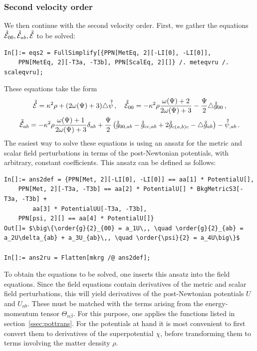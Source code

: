 \documentclass[notitlepage,a4paper,aps,prd,onecolumn,superscriptaddress,nofootinbib,groupedaddress,longbibliography]{revtex4-1}
\newcommand{\order}[2]{\accentset{#2}{#1}}
\begin{document}
\subsubsection{Second velocity order}\label{sssec:vel2}
We then continue with the second velocity order. First, we gather the equations \(\order{\mathcal{E}}{2}_{00}, \order{\mathcal{E}}{2}_{ab}, \order{\mathcal{E}}{2}\) to be solved:
\begin{lstlisting}
In[]:= eqs2 = FullSimplify[{PPN[MetEq, 2][-LI[0], -LI[0]],
	PPN[MetEq, 2][-T3a, -T3b], PPN[ScalEq, 2][]} /. meteqvru /. scaleqvru];
\end{lstlisting}
These equations take the form
\begin{gather}
\order{\mathcal{E}}{2} = \kappa^2\rho + (2\omega(\Psi) + 3)\triangle\order{\psi}{2}\,, \quad
\order{\mathcal{E}}{2}_{00} = -\kappa^2\rho\frac{\omega(\Psi) + 2}{2\omega(\Psi) + 3} - \frac{\Psi}{2}\triangle\order{g}{2}_{00}\,,\nonumber\\
\order{\mathcal{E}}{2}_{ab} = -\kappa^2\rho\frac{\omega(\Psi) + 1}{2\omega(\Psi) + 3}\delta_{ab} + \frac{\Psi}{2}\left(\order{g}{2}_{00,ab} - \order{g}{2}_{cc,ab} + 2\order{g}{2}_{c(a,b)c} - \triangle\order{g}{2}_{ab}\right) - \order{\psi}{2}_{,ab}\,.
\end{gather}
The easiest way to solve these equations is using an ansatz for the metric and scalar field perturbations in terms of the post-Newtonian potentials, with arbitrary, constant coefficients. This ansatz can be defined as follows:
\begin{lstlisting}
In[]:= ans2def = {PPN[Met, 2][-LI[0], -LI[0]] == aa[1] * PotentialU[],
	PPN[Met, 2][-T3a, -T3b] == aa[2] * PotentialU[] * BkgMetricS3[-T3a, -T3b] +
		aa[3] * PotentialUU[-T3a, -T3b],
	PPN[psi, 2][] == aa[4] * PotentialU[]}
Out[]= $\big\{\order{g}{2}_{00} = a_1U\,, \quad \order{g}{2}_{ab} = a_2U\delta_{ab} + a_3U_{ab}\,, \quad \order{\psi}{2} = a_4U\big\}$

In[]:= ans2ru = Flatten[mkrg /@ ans2def];
\end{lstlisting}
To obtain the equations to be solved, one inserts this ansatz into the field equations. Since the field equations contain derivatives of the metric and scalar field perturbations, this will yield derivatives of the post-Newtonian potentials \(U\) and \(U_{ab}\). These must be matched with the terms arising from the energy-momentum tensor \(\Theta_{\alpha\beta}\). For this purpose, one applies the functions listed in section~\ref{ssec:pottrans}. For the potentials at hand it is most convenient to first convert them to derivatives of the superpotential \(\chi\), before transforming them to terms involving the matter density \(\rho\).
\end{document}
